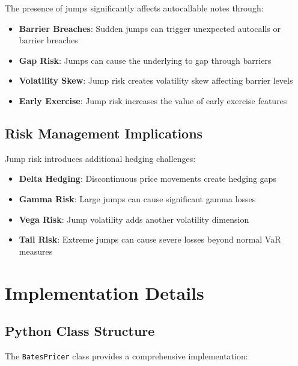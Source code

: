\documentclass[12pt,a4paper]{article}
\begin{document}
The presence of jumps significantly affects autocallable notes through:

\begin{itemize}
    \item \textbf{Barrier Breaches}: Sudden jumps can trigger unexpected autocalls or barrier breaches
    \item \textbf{Gap Risk}: Jumps can cause the underlying to gap through barriers
    \item \textbf{Volatility Skew}: Jump risk creates volatility skew affecting barrier levels
    \item \textbf{Early Exercise}: Jump risk increases the value of early exercise features
\end{itemize}

\subsection{Risk Management Implications}

Jump risk introduces additional hedging challenges:

\begin{itemize}
    \item \textbf{Delta Hedging}: Discontinuous price movements create hedging gaps
    \item \textbf{Gamma Risk}: Large jumps can cause significant gamma losses
    \item \textbf{Vega Risk}: Jump volatility adds another volatility dimension
    \item \textbf{Tail Risk}: Extreme jumps can cause severe losses beyond normal VaR measures
\end{itemize}

\section{Implementation Details}

\subsection{Python Class Structure}

The \texttt{BatesPricer} class provides a comprehensive implementation:
\end{document}
